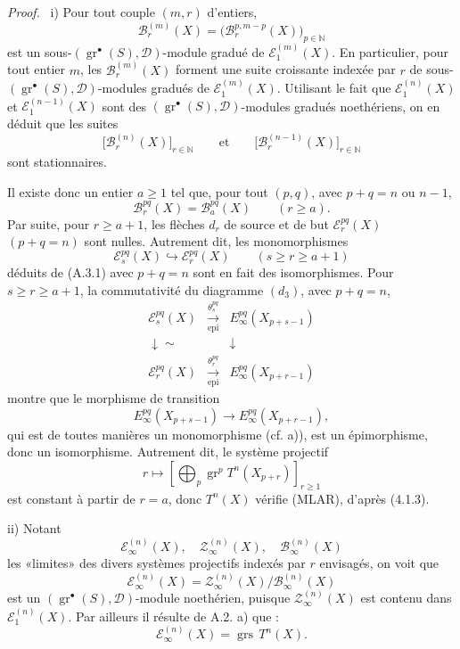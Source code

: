 \documentclass[11pt]{article}
\newenvironment{prooftext}[1][Proof]{\par\noindent\emph{#1.}\ }{\par\medskip}
\providecommand{\gr}{\operatorname{gr}}
\providecommand{\gr}{\operatorname{gr}}
\providecommand{\gr}{\operatorname{gr}}
\providecommand{\grs}{\operatorname{grs}}
\providecommand{\epi}{\operatorname{epi}}
\begin{document}
\begin{prooftext}
i) Pour tout couple \((m,r)\) d'entiers,
\[
\mathcal B_r^{(m)}(X)=\bigl(\mathcal B_r^{p,m-p}(X)\bigr)_{p\in\mathbb N}
\]
est un sous-\((\gr^\bullet(S),\mathcal D)\)-module gradué de \(\mathcal E_1^{(m)}(X)\). En particulier, pour tout entier \(m\), les \(\mathcal B_r^{(m)}(X)\) forment une suite croissante indexée par \(r\) de sous-\((\gr^\bullet(S),\mathcal D)\)-modules gradués de \(\mathcal E_1^{(m)}(X)\). Utilisant le fait que \(\mathcal E_1^{(n)}(X)\) et \(\mathcal E_1^{(n-1)}(X)\) sont des \((\gr^\bullet(S),\mathcal D)\)-modules gradués noethériens, on en déduit que les suites
\[
\bigl[\mathcal B_r^{(n)}(X)\bigr]_{r\in\mathbb N}
\qquad\text{et}\qquad
\bigl[\mathcal B_r^{(n-1)}(X)\bigr]_{r\in\mathbb N}
\]
sont stationnaires.

Il existe donc un entier \(a\ge1\) tel que, pour tout \((p,q)\), avec \(p+q=n\) ou \(n-1\),
\begin{equation}
\mathcal B_r^{pq}(X)=\mathcal B_a^{pq}(X)\qquad(r\ge a).
\tag{A.3.1}
\end{equation}
Par suite, pour \(r\ge a+1\), les flèches \(d_r\) de source et de but \(\mathcal E_r^{pq}(X)\) \((p+q=n)\) sont nulles. Autrement dit, les monomorphismes
\[
\mathcal E_s^{pq}(X)\hookrightarrow\mathcal E_r^{pq}(X)\qquad(s\ge r\ge a+1)
\]
déduits de (A.3.1) avec \(p+q=n\) sont en fait des isomorphismes. Pour \(s\ge r\ge a+1\), la commutativité du diagramme \((d_3)\), avec \(p+q=n\),
\[
\begin{array}{ccc}
\mathcal E_s^{pq}(X)&\xrightarrow[\epi]{\theta_s^{pq}}&E_\infty^{pq}(X_{p+s-1})\\
\downarrow\sim&&\downarrow\\
\mathcal E_r^{pq}(X)&\xrightarrow[\epi]{\theta_r^{pq}}&E_\infty^{pq}(X_{p+r-1})
\end{array}
\]
montre que le morphisme de transition
\[
E_\infty^{pq}(X_{p+s-1})\longrightarrow E_\infty^{pq}(X_{p+r-1}),
\]
qui est de toutes manières un monomorphisme (cf. a)), est un épimorphisme, donc un isomorphisme. Autrement dit, le système projectif
\[
r\longmapsto\left[\bigoplus_p\gr^p T^n(X_{p+r})\right]_{r\ge1}
\]
est constant à partir de \(r=a\), donc \(T^n(X)\) vérifie (MLAR), d'après (4.1.3).

ii) Notant
\[
\mathcal E_\infty^{(n)}(X),\quad
\mathcal Z_\infty^{(n)}(X),\quad
\mathcal B_\infty^{(n)}(X)
\]
les «limites» des divers systèmes projectifs indexés par \(r\) envisagés, on voit que
\[
\mathcal E_\infty^{(n)}(X)=
\mathcal Z_\infty^{(n)}(X)/\mathcal B_\infty^{(n)}(X)
\]
est un \((\gr^\bullet(S),\mathcal D)\)-module noethérien, puisque \(\mathcal Z_\infty^{(n)}(X)\) est contenu dans \(\mathcal E_1^{(n)}(X)\). Par ailleurs il résulte de A.2. a) que :
\[
\mathcal E_\infty^{(n)}(X)=\grs\,T^n(X).
\]
\end{prooftext}
\end{document}
